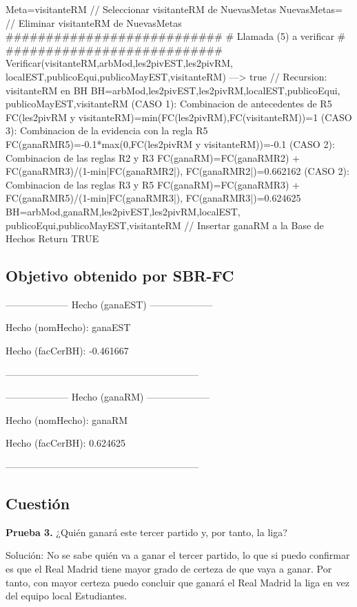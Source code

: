 \begin{listing}[language=Pascal]
	Meta=visitanteRM // Seleccionar visitanteRM de NuevasMetas
	NuevasMetas={} // Eliminar visitanteRM de NuevasMetas
  ###########################
  # Llamada (5) a verificar #
  ###########################
	Verificar(visitanteRM,{arbMod,les2pivEST,les2pivRM, localEST,publicoEqui,publicoMayEST,visitanteRM}) ---> true // Recursion: visitanteRM en BH
	BH={arbMod,les2pivEST,les2pivRM,localEST,publicoEqui, publicoMayEST,visitanteRM}
	(CASO 1): Combinacion de antecedentes de R5
	 FC(les2pivRM y visitanteRM)=min(FC(les2pivRM),FC(visitanteRM))=1
	(CASO 3): Combinacion de la evidencia con la regla R5
	 FC(ganaRM{R5})=-0.1*max(0,FC(les2pivRM y visitanteRM))=-0.1
	(CASO 2): Combinacion de las reglas R2 y R3
	 FC(ganaRM)=FC(ganaRM{R2}) + FC(ganaRM{R3})/(1-min{|FC(ganaRM{R2}|), FC(ganaRM{R2}|})=0.662162
	(CASO 2): Combinacion de las reglas R3 y R5
	 FC(ganaRM)=FC(ganaRM{R3}) + FC(ganaRM{R5})/(1-min{|FC(ganaRM{R3}|), FC(ganaRM{R3}|})=0.624625
	BH={arbMod,ganaRM,les2pivEST,les2pivRM,localEST, publicoEqui,publicoMayEST,visitanteRM} // Insertar ganaRM a la Base de Hechos
Return TRUE
\end{listing}

\subsection{Objetivo obtenido por SBR-FC}
\begin{center}
\par -------------------- Hecho (ganaEST) --------------------
\par Hecho (nomHecho): ganaEST
\par Hecho (facCerBH): -0.461667
\par ------------------------------------------------------------
\par -------------------- Hecho (ganaRM) --------------------
\par Hecho (nomHecho): ganaRM
\par Hecho (facCerBH): 0.624625
\par ------------------------------------------------------------
\end{center}
\newpage
\subsection{Cuestión}
\begin{ejer}
	\textbf{Prueba 3.} ¿Quién ganará este tercer partido y, por tanto, la liga?
\end{ejer}
Solución: No se sabe quién va a ganar el tercer partido, lo que si puedo confirmar es que
el Real Madrid tiene mayor grado de certeza de que vaya a ganar. Por tanto, con mayor certeza puedo concluir que
ganará el Real Madrid la liga en vez del equipo local Estudiantes.